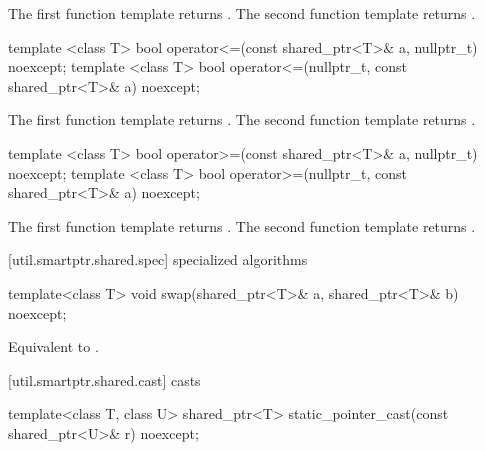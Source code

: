\begin{itemdescr}
\pnum
\returns
The first function template returns .
The second function template returns .
\end{itemdescr}

%
\begin{itemdecl}
template <class T>
  bool operator<=(const shared_ptr<T>& a, nullptr_t) noexcept;
template <class T>
  bool operator<=(nullptr_t, const shared_ptr<T>& a) noexcept;
\end{itemdecl}

\begin{itemdescr}
\pnum
\returns
The first function template returns .
The second function template returns .
\end{itemdescr}

%
\begin{itemdecl}
template <class T>
  bool operator>=(const shared_ptr<T>& a, nullptr_t) noexcept;
template <class T>
  bool operator>=(nullptr_t, const shared_ptr<T>& a) noexcept;
\end{itemdecl}

\begin{itemdescr}
\pnum
\returns
The first function template returns .
The second function template returns .
\end{itemdescr}

[util.smartptr.shared.spec]{ specialized algorithms}

%
\begin{itemdecl}
template<class T> void swap(shared_ptr<T>& a, shared_ptr<T>& b) noexcept;
\end{itemdecl}

\begin{itemdescr}
\pnum\effects  Equivalent to .
\end{itemdescr}

[util.smartptr.shared.cast]{ casts}

%
\begin{itemdecl}
template<class T, class U> shared_ptr<T> static_pointer_cast(const shared_ptr<U>& r) noexcept;
\end{itemdecl}

